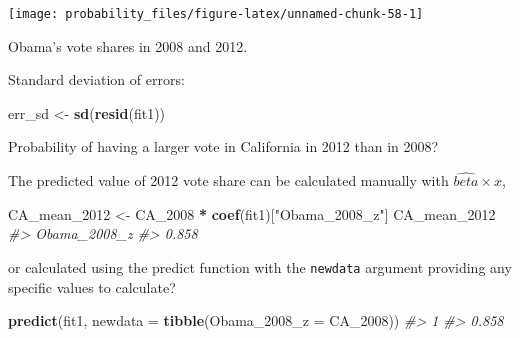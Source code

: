 \documentclass[]{book}
\newenvironment{Shaded}{\begin{snugshade}}{\end{snugshade}}
\newcommand{\CommentTok}[1]{\textcolor[rgb]{0.56,0.35,0.01}{\textit{#1}}}
\newcommand{\DataTypeTok}[1]{\textcolor[rgb]{0.13,0.29,0.53}{#1}}
\newcommand{\DecValTok}[1]{\textcolor[rgb]{0.00,0.00,0.81}{#1}}
\newcommand{\KeywordTok}[1]{\textcolor[rgb]{0.13,0.29,0.53}{\textbf{#1}}}
\newcommand{\NormalTok}[1]{#1}
\newcommand{\OperatorTok}[1]{\textcolor[rgb]{0.81,0.36,0.00}{\textbf{#1}}}
\newcommand{\StringTok}[1]{\textcolor[rgb]{0.31,0.60,0.02}{#1}}
\theoremstyle{definition}
\theoremstyle{definition}
\theoremstyle{definition}
\theoremstyle{remark}
\begin{document}
\begin{center}\texttt{[image: probability\_files/figure-latex/unnamed-chunk-58-1]} \end{center}

Obama's vote shares in 2008 and 2012.

Standard deviation of errors:

\begin{Shaded}
\begin{Highlighting}[]
\NormalTok{err_sd <-}\StringTok{ }\KeywordTok{sd}\NormalTok{(}\KeywordTok{resid}\NormalTok{(fit1))}
\end{Highlighting}
\end{Shaded}

Probability of having a larger vote in California in 2012 than in 2008?

\begin{Shaded}
\end{Shaded}

The predicted value of 2012 vote share can be calculated manually with
\(\hat{beta} \times x\),

\begin{Shaded}
\begin{Highlighting}[]
\NormalTok{CA_mean_}\DecValTok{2012}\NormalTok{ <-}\StringTok{ }\NormalTok{CA_}\DecValTok{2008} \OperatorTok{*}\StringTok{ }\KeywordTok{coef}\NormalTok{(fit1)[}\StringTok{"Obama_2008_z"}\NormalTok{]}
\NormalTok{CA_mean_}\DecValTok{2012}
\CommentTok{#> Obama_2008_z }
\CommentTok{#>        0.858}
\end{Highlighting}
\end{Shaded}

or calculated using the predict function with the \texttt{newdata}
argument providing any specific values to calculate?

\begin{Shaded}
\begin{Highlighting}[]
\KeywordTok{predict}\NormalTok{(fit1, }\DataTypeTok{newdata =} \KeywordTok{tibble}\NormalTok{(}\DataTypeTok{Obama_2008_z =}\NormalTok{ CA_}\DecValTok{2008}\NormalTok{))}
\CommentTok{#>     1 }
\CommentTok{#> 0.858}
\end{Highlighting}
\end{Shaded}
\end{document}
